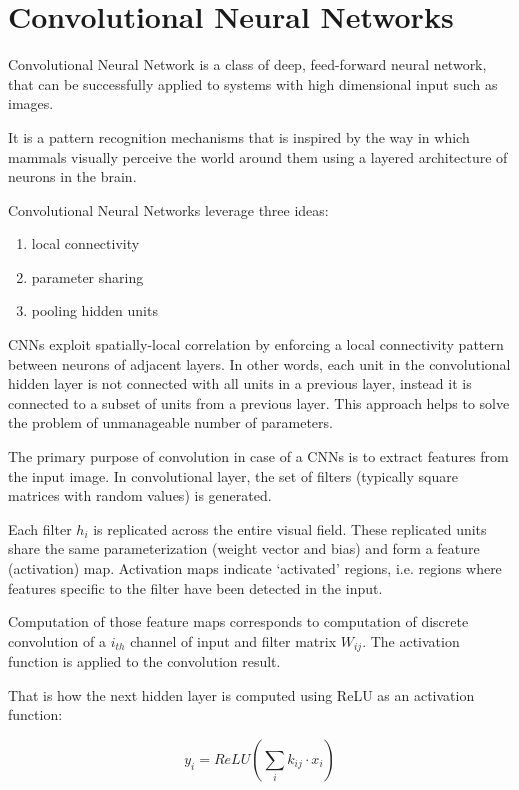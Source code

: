 \chapter{Convolutional Neural Networks}
Convolutional Neural Network is a class of deep, feed-forward neural network, that can be successfully applied to systems with high dimensional input such as images.

It is a pattern recognition mechanisms that is inspired by the way in which mammals visually perceive the world around them using a layered architecture of neurons in the brain. 

Convolutional Neural Networks leverage three ideas:
\begin{enumerate}
\itemsep0em 
\item local connectivity
\item parameter sharing
\item pooling hidden units
\end{enumerate}

CNNs exploit spatially-local correlation by enforcing a local connectivity pattern between neurons of adjacent layers. In other words, each unit in the convolutional hidden layer is not connected with all units in a previous layer, instead it is connected to a subset of units from a previous layer. This approach helps to solve the problem of unmanageable number of parameters. 


The primary purpose of convolution in case of a CNNs is to extract features from the input image. In convolutional layer, the set of filters (typically square matrices with random values) is generated. 

Each filter $h_{i}$ is replicated across the entire visual field. These replicated units share the same parameterization (weight vector and bias) and form a feature (activation) map. Activation maps indicate ‘activated’ regions, i.e. regions where features specific to the filter have been detected in the input. 

Computation of those feature maps corresponds to computation of discrete convolution of a $i_{th}$ channel of input and filter matrix $W_{ij}$. The activation function is applied to the convolution result.

That is how the next hidden layer is computed using ReLU as an activation function:

\begin{equation}
y_{i} = ReLU(\sum_{i} k_{ij} \cdot x_{i})
\end{equation}

